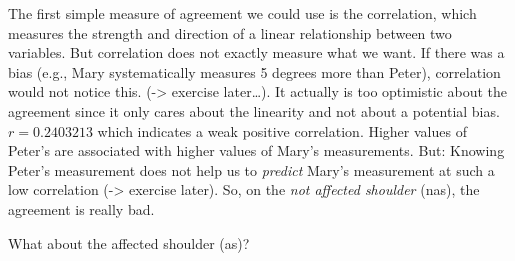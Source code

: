 \documentclass[
]{book}
\begin{document}
The first simple measure of agreement we could use is the correlation, which
measures the strength and direction of a linear relationship between two variables.
But correlation does not exactly measure what we want. If there was a bias
(e.g., Mary systematically measures 5 degrees more than Peter), correlation would not
notice this. (-\textgreater{} exercise later\ldots). It actually is too optimistic about
the agreement since it only cares about the linearity and not about a potential bias.
\(r=0.2403213\) which indicates a weak positive correlation. Higher values of Peter's
are associated with higher values of Mary's measurements.
But: Knowing Peter's measurement does not help us to \emph{predict} Mary's measurement
at such a low correlation (-\textgreater{} exercise later).
So, on the \emph{not affected shoulder} (nas), the agreement is really bad.

What about the affected shoulder (as)?
\end{document}
